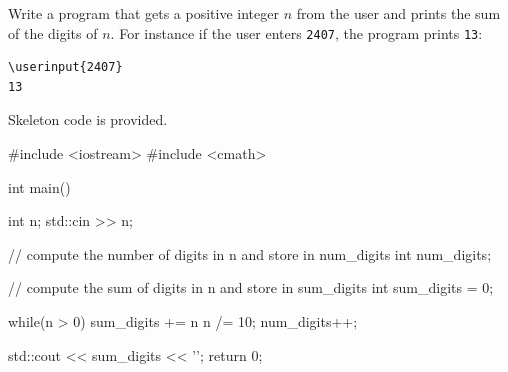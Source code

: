 \nextq
Write a program that gets a positive integer $n$ from the user
and prints the sum of the digits of $n$.
For instance if the user enters \verb!2407!, the program prints
\verb!13!:
\begin{Verbatim}[frame=single,fontsize=\footnotesize,commandchars=\\\{\}]
\userinput{2407}
13
\end{Verbatim}
Skeleton code is provided.
\\
\ANSWER
\begin{answercode}
#include <iostream>
#include <cmath>

int main()
{
    int n;
    std::cin >> n;

    // compute the number of digits in n and store in num_digits
    int num_digits;

    // compute the sum of digits in n and store in sum_digits
    int sum_digits = 0;

    while(n > 0)
    {
         sum_digits += n %
         n /= 10;
         num_digits++;
    }
    
    std::cout << sum_digits << '\n';
    return 0;
}
\end{answercode}


